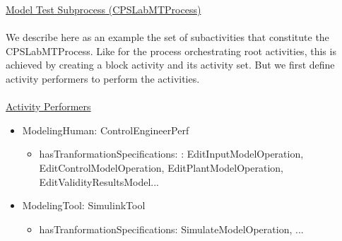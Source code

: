 \noindent\uline{Model Test Subprocess (CPSLabMTProcess)}
\\
\\
We describe here as an example the set of subactivities that constitute the CPSLabMTProcess. Like for the process orchestrating root activities, this is achieved by creating a block activity and its activity set. But we first define activity performers to perform the activities.
\\
\\
\noindent\uline{Activity Performers}
     \begin{itemize}
    \item ModelingHuman: ControlEngineerPerf
        \begin{itemize}
            \item hasTranformationSpecifications: : EditInputModelOperation, EditControlModelOperation, EditPlantModelOperation, EditValidityResultsModel...
        \end{itemize}
    \item ModelingTool: SimulinkTool
        \begin{itemize}
            \item hasTranformationSpecifications: SimulateModelOperation, ...
        \end{itemize}
    \end{itemize}

